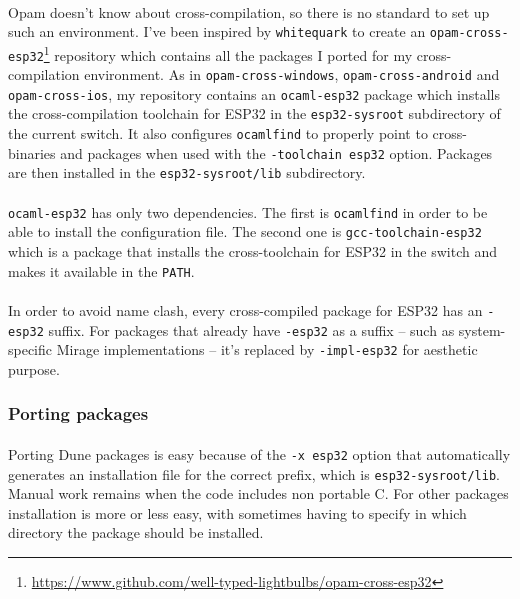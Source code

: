 \documentclass[a4paper]{article}
\begin{document}
\paragraph{}
Opam doesn't know about cross-compilation, so there is no standard to set up such an environment. I've been inspired by \texttt{whitequark} to create an \texttt{opam-cross-esp32}\footnote{\url{https://www.github.com/well-typed-lightbulbs/opam-cross-esp32}} repository which contains all the packages I ported for my cross-compilation environment. As in \texttt{opam-cross-windows}, \texttt{opam-cross-android} and \texttt{opam-cross-ios}, my repository contains an \texttt{ocaml-esp32} package which installs the cross-compilation toolchain for ESP32 in the \texttt{esp32-sysroot} subdirectory of the current switch. It also configures \texttt{ocamlfind} to properly point to cross-binaries and packages when used with the \texttt{-toolchain esp32} option. Packages are then installed in the \texttt{esp32-sysroot/lib} subdirectory.
\paragraph{}
\texttt{ocaml-esp32} has only two dependencies. The first is \texttt{ocamlfind} in order to be able to install the configuration file. The second one is \texttt{gcc-toolchain-esp32} which is a package that installs the cross-toolchain for ESP32 in the switch and makes it available in the \texttt{PATH}.
\paragraph{} In order to avoid name clash, every cross-compiled package for ESP32 has an \texttt{-esp32} suffix. For packages that already have \texttt{-esp32} as a suffix -- such as system-specific Mirage implementations -- it's replaced by \texttt{-impl-esp32} for aesthetic purpose. 
\subsubsection{Porting packages}
\paragraph{} 
Porting Dune packages is easy because of the \texttt{-x esp32} option that automatically generates an installation file for the correct prefix, which is \texttt{esp32-sysroot/lib}. Manual work remains when the code includes non portable C. For other packages installation is more or less easy, with sometimes having to specify in which directory the package should be installed.
\end{document}
